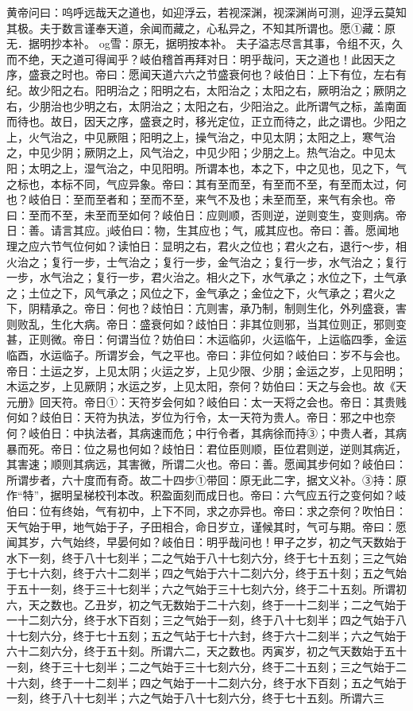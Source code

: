 \documentclass[a4paper,12pt,UTF8,twoside]{ctexbook}
\begin{document}
黄帝问曰：呜呼远哉天之道也，如迎浮云，若视深渊，视深渊尚可测，迎浮云莫知其极。夫于数言谨奉天道，余闻而藏之，心私异之，不知其所谓也。愿①藏：原无．据明抄本补。
og雪：原无，据明按本补。
夫子溢志尽言其事，令组不灭，久而不绝，天之道可得闻乎？岐伯稽首再拜对日：明乎哉问，天之道也！此因天之序，盛衰之时也。帝曰：愿闻天道六六之节盛衰何也？岐伯日：上下有位，左右有纪。故少阳之右。阳明治之；阳明之右，太阳治之；太阳之右，厥明治之；厥阴之右，少朋治也少明之右，太阴治之；太阳之右，少阳治之。此所谓气之标，盖南面而待也。故日，因天之序，盛衰之时，移光定位，正立而待之，此之谓也。少阳之上，火气治之，中见厥阻；阳明之上，操气治之，中见太阴；太阳之上，寒气治之，中见少阴；厥阴之上，风气治之，中见少阳；少朋之上。热气治之。中见太阳；太明之上，湿气治之，中见阳明。所谓本也，本之下，中之见也，见之下，气之标也，本标不同，气应异象。帝曰：其有至而至，有至而不至，有至而太过，何也？岐伯日：至而至者和；至而不至，来气不及也；未至而至，来气有余也。帝曰：至而不至，未至而至如何？岐伯日：应则顺，否则逆，逆则变生，变则病。帝日：善。请言其应。j岐伯曰：物，生其应也；气，戚其应也。帝曰：善。愿闻地理之应六节气位何如？读怕日：显明之右，君火之位也；君火之右，退行～步，相火治之；复行一步，士气治之；复行一步，金气治之；复行一步，水气治之；复行一步，水气治之；复行一步，君火治之。相火之下，水气承之；水位之下，土气承之；土位之下，风气承之；风位之下，金气承之；金位之下，火气承之；君火之下，阴精承之。帝日：何也？歧怕日：亢则害，承乃制，制则生化，外列盛衰，害则败乱，生化大病。帝日：盛衰何如？歧怕日：非其位则邪，当其位则正，邪则变甚，正则微。帝日：何谓当位？妨伯曰：木运临卯，火运临午，上运临四季，金运临酉，水运临子。所谓岁会，气之平也。帝曰：非位何如？岐伯曰：岁不与会也。帝日：土运之岁，上见太阴；火运之岁，上见少限、少朋；金运之岁，上见阳明；木运之岁，上见厥阴；水运之岁，上见太阳，奈何？妨伯曰：天之与会也。故《天元册》回天符。帝日①：天符岁会何如？岐伯曰：太一天将之会也。帝日：其贵贱何如？歧伯日：天符为执法，岁位为行令，太一天符为贵人。帝日：邪之中也奈何？岐伯日：中执法者，其病速而危；中行令者，其病徐而持③；中贵人者，其病暴而死。帝日：位之易也何如？歧怕日：君位臣则顺，臣位君则逆，逆则其病近，其害速；顺则其病远，其害微，所谓二火也。帝曰：善。愿闻其步何如？岐伯曰：所谓步者，六十度而有奇。故二十四步①带回：原无此二字，据文义补。③持：原作“特”，据明呈梯校刊本改。积盈面刻而成日也。帝曰：六气应五行之变何如？岐伯曰：位有终始，气有初中，上下不同，求之亦异也。帝曰：求之奈何？吹怕日：天气始于甲，地气始于子，子田相合，命日岁立，谨候其时，气可与期。帝曰：愿闻其岁，六气始终，早晏何如？岐伯日：明乎哉问也！甲子之岁，初之气天数始于水下一刻，终于八十七刻半；二之气始于八十七刻六分，终于七十五刻；三之气始于七十六刻，终于六十二刻半；四之气始于六十二刻六分，终于五十刻；五之气始于五十一刻，终于三十七刻半；六之气始于三十七刻六分，终于二十五刻。所谓初六，天之数也。乙丑岁，初之气无数始于二十六刻，终于一十二刻半；二之气始于一十二刻六分，终于水下百刻；三之气始于一刻，终于八十七刻半；四之气始于八十七刻六分，终于七十五刻；五之气站于七十六封，终于六十二刻半；六之气始于六十二刻六分，终于五十刻。所谓六二，天之数也。丙寅岁，初之气天数始于五十一刻，终于三十七刻半；二之气始于三十七刻六分，终于二十五刻；三之气始于二十六刻，终于一十二刻半；四之气始于一十二刻六分，终于水下百刻；五之气始于一刻，终于八十七刻半；六之气始于八十七刻六分，终于七十五刻。所谓六三
\end{document}
